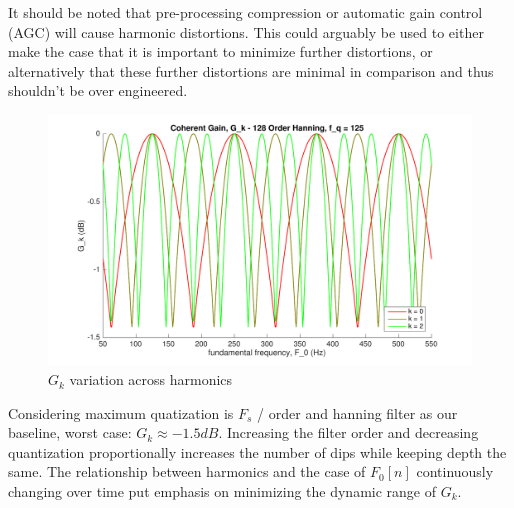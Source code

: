 \documentclass [11pt, proquest,oneside] {ganter_thesis}[2015/03/03]
\begin{document}
It should be noted that pre-processing compression or automatic gain control (AGC) will cause harmonic distortions.  This could arguably be used to either make the case that it is important to minimize further distortions, or alternatively that these further distortions are minimal in comparison and thus shouldn't be over engineered.

\begin{figure}[!ht]
  \centering
    \includegraphics[width=1\textwidth]{g_k_4}   
    \caption{$G_k$ variation across harmonics}\label{fig:g_k_4}
\end{figure}

Considering maximum quatization is $F_s$ / order and hanning filter as our baseline, worst case: $G_k \approx -1.5dB$.  Increasing the filter order and decreasing quantization proportionally increases the number of dips while keeping depth the same.  The relationship between harmonics and the case of $F_0[n]$ continuously changing over time put emphasis on minimizing the dynamic range of $G_k$.




\end{document}
